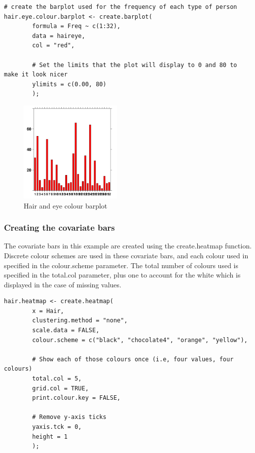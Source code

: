 \documentclass[letterpaper]{article}
\begin{document}
\begin{verbatim}
# create the barplot used for the frequency of each type of person
hair.eye.colour.barplot <- create.barplot(
        formula = Freq ~ c(1:32),
        data = haireye,
        col = "red",

        # Set the limits that the plot will display to 0 and 80 to make it look nicer
        ylimits = c(0.00, 80)
        );
\end{verbatim}

\begin{figure}[!ht]
  \begin{center}
     \includegraphics[width=50mm]{Figures/ex1_barplot.png}
     \caption{Hair and eye colour barplot}
     \label{fig:picture}
  \end{center}
\end{figure}

\subsubsection{Creating the covariate bars}
The covariate bars in this example are created using the create.heatmap function.  Discrete colour schemes are used in these covariate bars, and each colour used in specified in the colour.scheme parameter. The total number of colours used is specified in the total.col parameter, plus one to account for the white which is displayed in the case of missing values.

\begin{verbatim}
hair.heatmap <- create.heatmap(
        x = Hair,
        clustering.method = "none",
        scale.data = FALSE,
        colour.scheme = c("black", "chocolate4", "orange", "yellow"),
    
        # Show each of those colours once (i.e, four values, four colours)
        total.col = 5,
        grid.col = TRUE,
        print.colour.key = FALSE,

        # Remove y-axis ticks
        yaxis.tck = 0,
        height = 1
        );
\end{verbatim}
\end{document}
